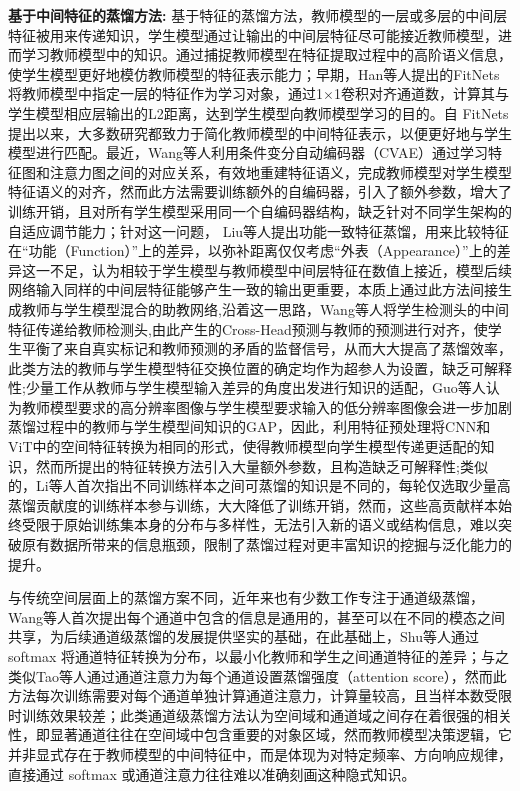 \documentclass[10.5pt,letterpaper]{article}
\begin{document}
\textbf{基于中间特征的蒸馏方法:}
	基于特征的蒸馏方法，教师模型的一层或多层的中间层特征被用来传递知识，学生模型通过让输出的中间层特征尽可能接近教师模型，进而学习教师模型中的知识。通过捕捉教师模型在特征提取过程中的高阶语义信息，使学生模型更好地模仿教师模型的特征表示能力；早期，Han等人\cite{han-nips2015-learning}提出的FitNets将教师模型中指定一层的特征作为学习对象，通过1$\times$1卷积对齐通道数，计算其与学生模型相应层输出的L2距离，达到学生模型向教师模型学习的目的。自 FitNets 提出以来，大多数研究都致力于简化教师模型的中间特征表示，以便更好地与学生模型进行匹配。最近，Wang等人\cite{wang-aaai2024-gkd}利用条件变分自动编码器（CVAE）通过学习特征图和注意力图之间的对应关系，有效地重建特征语义，完成教师模型对学生模型特征语义的对齐，然而此方法需要训练额外的自编码器，引入了额外参数，增大了训练开销，且对所有学生模型采用同一个自编码器结构，缺乏针对不同学生架构的自适应调节能力；针对这一问题，	Liu等人\cite{liu-iclr2023-fkd}提出功能一致特征蒸馏，用来比较特征在“功能（Function）”上的差异，以弥补距离仅仅考虑“外表（Appearance）”上的差异这一不足，认为相较于学生模型与教师模型中间层特征在数值上接近，模型后续网络输入同样的中间层特征能够产生一致的输出更重要，本质上通过此方法间接生成教师与学生模型混合的助教网络,沿着这一思路，Wang等人\cite{wang-cvpr2024-crosskd}将学生检测头的中间特征传递给教师检测头,由此产生的Cross-Head预测与教师的预测进行对齐，使学生平衡了来自真实标记和教师预测的矛盾的监督信号，从而大大提高了蒸馏效率，此类方法的教师与学生模型特征交换位置的确定均作为超参人为设置，缺乏可解释性;少量工作从教师与学生模型输入差异的角度出发进行知识的适配，Guo等人\cite{guo-tpami2024-pixelkd}认为教师模型要求的高分辨率图像与学生模型要求输入的低分辨率图像会进一步加剧蒸馏过程中的教师与学生模型间知识的GAP，因此，利用特征预处理将CNN和ViT中的空间特征转换为相同的形式，使得教师模型向学生模型传递更适配的知识，然而所提出的特征转换方法引入大量额外参数，且构造缺乏可解释性;类似的，Li等人\cite{li-acmmm2025-slakd}首次指出不同训练样本之间可蒸馏的知识是不同的，每轮仅选取少量高蒸馏贡献度的训练样本参与训练，大大降低了训练开销，然而，这些高贡献样本始终受限于原始训练集本身的分布与多样性，无法引入新的语义或结构信息，难以突破原有数据所带来的信息瓶颈，限制了蒸馏过程对更丰富知识的挖掘与泛化能力的提升。
	
	与传统空间层面上的蒸馏方案不同，近年来也有少数工作专注于通道级蒸馏，Wang等人\cite{wang-nips2020-fusion}首次提出每个通道中包含的信息是通用的，甚至可以在不同的模态之间共享，为后续通道级蒸馏的发展提供坚实的基础，在此基础上，Shu等人\cite{shu-iccv2021-channelkd}通过 softmax 将通道特征转换为分布，以最小化教师和学生之间通道特征的差异；与之类似Tao等人\cite{tao-aaai2025-channelkd}通过通道注意力为每个通道设置蒸馏强度（attention score），然而此方法每次训练需要对每个通道单独计算通道注意力，计算量较高，且当样本数受限时训练效果较差；此类通道级蒸馏方法认为空间域和通道域之间存在着很强的相关性，即显著通道往往在空间域中包含重要的对象区域，然而教师模型决策逻辑，它并非显式存在于教师模型的中间特征中，而是体现为对特定频率、方向响应规律，直接通过 softmax 或通道注意力往往难以准确刻画这种隐式知识。
	
\end{document}
